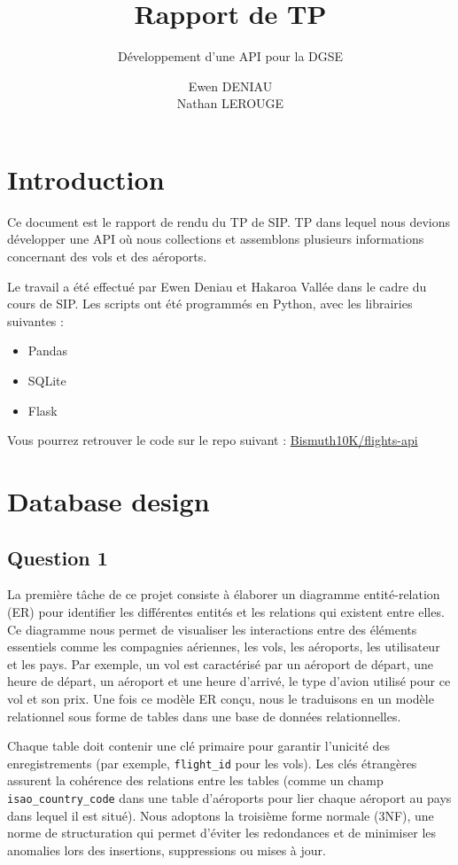 \documentclass{ceri/sty/rapport}
\title{Rapport de TP}
\subtitle{Développement d'une API pour la DGSE} %
\author{
Ewen DENIAU\\
Nathan LEROUGE
}
\begin{document}
 

\maketitle

\sloppy      

\section{Introduction}
Ce document est le rapport de rendu du TP de SIP.
TP dans lequel nous devions développer une API où nous collections et assemblons plusieurs informations concernant des vols et des aéroports.

Le travail a été effectué par Ewen Deniau et Hakaroa Vallée dans le cadre du cours de SIP.
Les scripts ont été programmés en Python, avec les librairies suivantes :
\begin{itemize}
    \item Pandas
    \item SQLite
    \item Flask
\end{itemize}

Vous pourrez retrouver le code sur le repo suivant : \href{https://github.com/Bismuth10K/flights-api}{Bismuth10K/flights-api}

\section{Database design}
\subsection{Question 1}
La première tâche de ce projet consiste à élaborer un diagramme entité-relation (ER) pour identifier les différentes entités et les relations qui existent entre elles. Ce diagramme nous permet de visualiser les interactions entre des éléments essentiels comme les compagnies aériennes, les vols, les aéroports, les utilisateur et les pays. Par exemple, un vol est caractérisé par un aéroport de départ, une heure de départ, un aéroport et une heure d'arrivé, le type d'avion utilisé pour ce vol et son prix. Une fois ce modèle ER conçu, nous le traduisons en un modèle relationnel sous forme de tables dans une base de données relationnelles.

Chaque table doit contenir une clé primaire pour garantir l'unicité des enregistrements (par exemple, \texttt{flight\_id} pour les vols).
Les clés étrangères assurent la cohérence des relations entre les tables (comme un champ \texttt{isao\_country\_code} dans une table d'aéroports pour lier chaque aéroport au pays dans lequel il est situé).
Nous adoptons la troisième forme normale (3NF), une norme de structuration qui permet d'éviter les redondances et de minimiser les anomalies lors des insertions, suppressions ou mises à jour.
\end{document}
